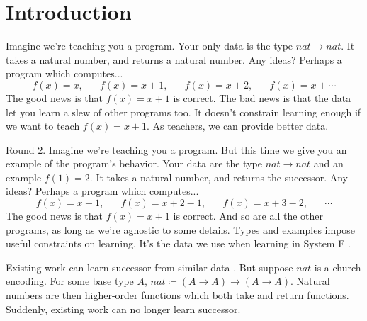 \documentclass[acmsmall]{acmart}
\begin{document}


\maketitle


\section{Introduction}

Imagine we're teaching you a program. Your only data is the type $nat \!\to\! nat$. It takes a natural number, and returns a natural number. Any ideas? Perhaps a program which computes...
$$f(x) = x, \;\;\;\;\;\;f(x) = x + 1,\;\;\;\;\;\; f(x) = x + 2,\;\;\;\;\;\; f(x) = x + \cdots$$
The good news is that $f(x) = x + 1$ is correct. The bad news is that the data let you learn a slew of other programs too. It doesn't constrain learning enough if we want to teach $f(x) = x + 1$. As teachers, we can provide better data.

Round 2. Imagine we're teaching you a program. But this time we give you an example of the program's behavior. Your data are the type $nat \!\to\! nat$ and an example $f(1) = 2$. It takes a natural number, and returns the successor. Any ideas? Perhaps a program which computes...
$$f(x) = x + 1,\;\;\;\;\;\; f(x) = x + 2 - 1,\;\;\;\;\;\; f(x) = x + 3 - 2,\;\;\;\;\;\;\cdots$$
The good news is that $f(x) = x + 1$ is correct. And so are all the other programs, as long as we're agnostic to some details. Types and examples impose useful constraints on learning. It's the data we use when learning in System F \cite{girard1989proofs}.

Existing work can learn successor from similar data \cite{osera2015program, polikarpova2016program}. But suppose $nat$ is a church encoding. For some base type $A$, $nat \coloneqq (A \to A) \to (A \to A)$. Natural numbers are then higher-order functions which both take and return functions. Suddenly, existing work can no longer learn successor.
\end{document}
